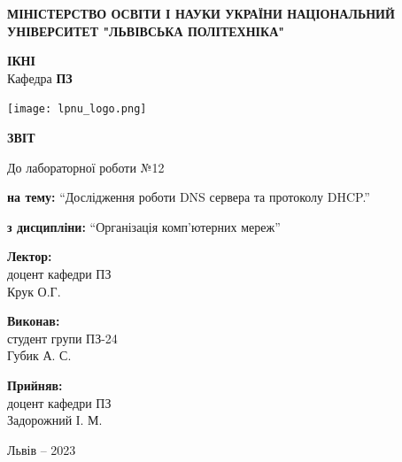 \documentclass[12pt]{extarticle}
\begin{document}
\begin{titlepage}
    \begin{center}
        \textbf{\normalsize{\MakeUppercase{
            Міністерство Освіти і науки України
            Національний університет "Львівська політехніка"
        }}}

        \begin{flushright}
        \textbf{ІКНІ}\\
        Кафедра \textbf{ПЗ}
        \end{flushright}
        \vspace{15mm}

        \texttt{[image: lpnu\_logo.png]}

        \vspace*{\fill}

        \textbf{\normalsize{\MakeUppercase{Звіт}}}
            
        До лабораторної роботи №12

        \textbf{на тему:} “Дослідження роботи DNS сервера та протоколу DHCP.”

        \textbf{з дисципліни:} “Організація комп'ютерних мереж”
            
        \vspace*{\fill}

        \begin{flushright}

            \textbf{Лектор:}\\
            доцент кафедри ПЗ\\
            Крук О.Г.\\
            \vspace{12pt}

            \textbf{Виконав:}\\
            студент групи ПЗ-24\\
            Губик А. С.\\
            \vspace{12pt}

            \textbf{Прийняв:}\\
            доцент кафедри ПЗ\\
            Задорожний І. М.\\
        \vspace{12pt}
        \end{flushright}

        Львів -- 2023
            
            
    \end{center}
\end{titlepage}
\end{document}
